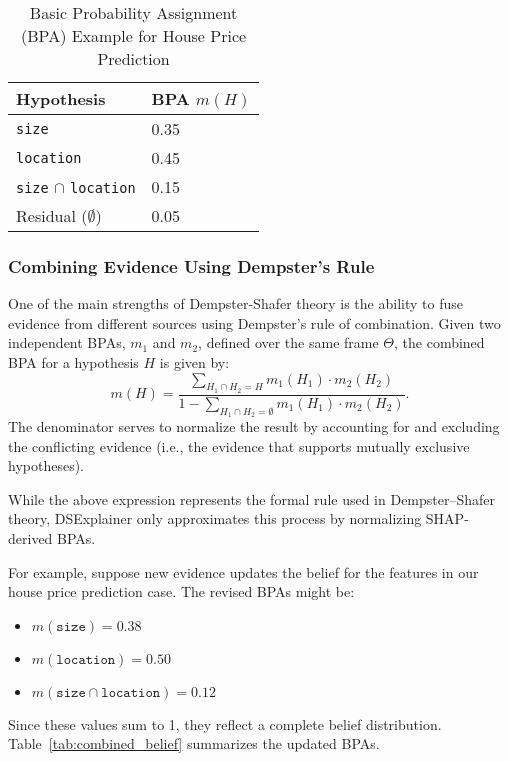 \documentclass[acmlarge]{acmart}
\begin{document}
\begin{table}[H]
    \caption{Basic Probability Assignment (BPA) Example for House Price Prediction}
    \label{tab:bpa_example}
    \centering
    \begin{tabularx}{\textwidth}{|Y|Y|}
        \hline
        \textbf{Hypothesis} & \textbf{BPA \( m(H) \)} \\
        \hline
        \texttt{size} & 0.35 \\
        \hline
        \texttt{location} & 0.45 \\
        \hline
        \texttt{size} \(\cap\) \texttt{location} & 0.15 \\
        \hline
        Residual (\( \emptyset \)) & 0.05 \\
        \hline
    \end{tabularx}
\end{table}

\subsubsection{Combining Evidence Using Dempster's Rule}

One of the main strengths of Dempster-Shafer theory is the ability to fuse evidence from different sources using Dempster's rule of combination. Given two independent BPAs, \( m_1 \) and \( m_2 \), defined over the same frame \(\Theta\), the combined BPA for a hypothesis \( H \) is given by:
\[
m(H) = \frac{\sum_{H_1 \cap H_2 = H} m_1(H_1) \cdot m_2(H_2)}{1 - \sum_{H_1 \cap H_2 = \emptyset} m_1(H_1) \cdot m_2(H_2)}.
\]
The denominator serves to normalize the result by accounting for and excluding the conflicting evidence (i.e., the evidence that supports mutually exclusive hypotheses).

While the above expression represents the formal rule used in Dempster--Shafer theory, DSExplainer only approximates this process by normalizing SHAP-derived BPAs.

For example, suppose new evidence updates the belief for the features in our house price prediction case. The revised BPAs might be:
\begin{itemize}
    \item \( m(\texttt{size}) = 0.38 \)
    \item \( m(\texttt{location}) = 0.50 \)
    \item \( m(\texttt{size} \cap \texttt{location}) = 0.12 \)
\end{itemize}
Since these values sum to 1, they reflect a complete belief distribution. Table~\ref{tab:combined_belief} summarizes the updated BPAs.
\end{document}
